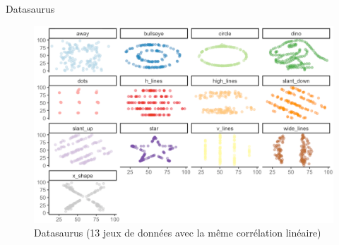 \documentclass[
  ignorenonframetext,
]{beamer}
\begin{document}
\begin{frame}{Datasaurus}
\protect\hypertarget{datasaurus}{}
\begin{figure}

{\centering \includegraphics{figures/DataSaurusDozen.pdf}

}

\caption{Datasaurus (13 jeux de données avec la même corrélation
linéaire)}

\end{figure}
\end{frame}
\end{document}
